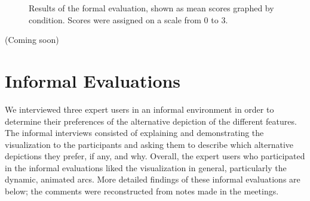 \begin{figure}
\centering


	\caption[Results of the formal evaluation, shown as mean scores graphed by condition.]{Results of the formal evaluation, shown as mean scores graphed by condition.  Scores were assigned on a scale from 0 to 3.}
	\label{fig:results}
\end{figure}

(Coming soon)


\section{Informal Evaluations}

We interviewed three expert users in an informal environment in order to determine their preferences of the alternative depiction of the different features.  The informal interviews consisted of explaining and demonstrating the visualization to the participants and asking them to describe which alternative depictions they prefer, if any, and why.  Overall, the expert users who participated in the informal evaluations liked the visualization in general, particularly the dynamic, animated arcs.  More detailed findings of these informal evaluations are below; the comments were reconstructed from notes made in the meetings.

